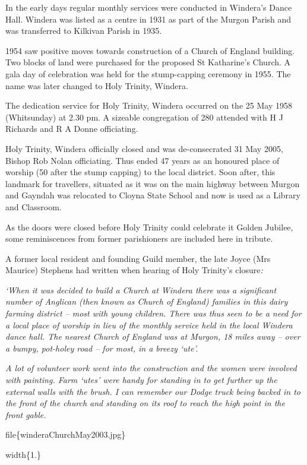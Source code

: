 In the early days regular monthly services were conducted in Windera's Dance Hall. Windera was listed as a centre in 1931 as part of the Murgon Parish and was transferred to Kilkivan Parish in 1935.

1954 saw positive moves towards construction of a Church of England building. Two blocks of land were purchased for the proposed St Katharine's Church. A gala day of celebration was held for the stump-capping ceremony in 1955. The name was later changed to Holy Trinity, Windera.

The dedication service for Holy Trinity, Windera occurred on the 25 May 1958 (Whitsunday) at 2.30 pm. A sizeable congregation of 280 attended with H J Richards and R A Donne officiating.

Holy Trinity, Windera officially closed and was de-consecrated 31 May 2005, Bishop Rob Nolan officiating. Thus ended 47 years as an honoured place of worship (50 after the stump capping) to the local district. Soon after, this landmark for travellers, situated as it was on the main highway between Murgon and Gayndah was relocated to Cloyna State School and now is used as a Library and Classroom.

As the doors were closed before Holy Trinity could celebrate it Golden Jubilee, some reminiscences from former parishioners are included here in tribute.

A former local resident and founding Guild member, the late Joyce (Mrs Maurice) Stephens had written when hearing of Holy Trinity's closure\emph{:}

\emph{`When it was decided to build a Church at Windera there was a significant number of Anglican (then known as Church of England) families in this dairy farming district -- most with young children. There was thus seen to be a need for a local place of worship in lieu of the monthly service held in the local Windera dance hall. The nearest Church of England was at Murgon, 18 miles away -- over a bumpy, pot-holey road -- for most, in a breezy `ute'.}

\emph{A lot of volunteer work went into the construction and the women were involved with painting. Farm `utes' were handy for standing in to get further up the external walls with the brush. I can remember our Dodge truck being backed in to the front of the church and standing on its roof to reach the high point in the front gable.}

file\{winderaChurchMay2003.jpg\}

width\{1.\}

